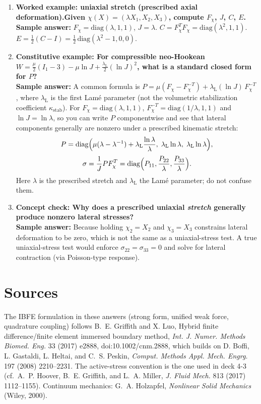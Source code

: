 \documentclass[12pt]{article}
\begin{document}
\begin{enumerate}
\item \textbf{Worked example: uniaxial stretch (prescribed axial deformation).\newline Given $\chi(X)=(\lambda X_1, X_2, X_3)$, compute $F_\chi$, $J$, $C$, $E$.}\\
\textbf{Sample answer:} $F_\chi=\mathrm{diag}(\lambda,1,1)$, $J=\lambda$.
$C=F_\chi^T F_\chi=\mathrm{diag}(\lambda^2,1,1)$.
$E=\tfrac12(C-I)=\tfrac12\,\mathrm{diag}(\lambda^2-1,0,0)$.

\item \textbf{Constitutive example: For compressible neo-Hookean $W=\frac{\mu}{2}(I_1-3)-\mu\ln J +\frac{\lambda_{\mathrm L}}{2}(\ln J)^2$,
what is a standard closed form for $P$?}\\
\textbf{Sample answer:} A common formula is
$P=\mu\left(F_\chi - F_\chi^{-T}\right) + \lambda_{\mathrm L}(\ln J)\,F_\chi^{-T}$,
where $\lambda_{\mathrm L}$ is the first Lam\'e parameter (not the volumetric stabilization coefficient $\kappa_{\mathrm{stab}}$).
For $F_\chi=\mathrm{diag}(\lambda,1,1)$, $F_\chi^{-T}=\mathrm{diag}(1/\lambda,1,1)$ and $\ln J=\ln\lambda$, so you can write
$P$ componentwise and see that lateral components generally are nonzero under a prescribed kinematic stretch:
\[
P=\mathrm{diag}\Bigl(\mu(\lambda-\lambda^{-1})+\lambda_{\mathrm L}\frac{\ln\lambda}{\lambda},\;
\lambda_{\mathrm L}\ln\lambda,\;\lambda_{\mathrm L}\ln\lambda\Bigr),
\]
\[
\sigma=\frac{1}{J}PF_\chi^T=\mathrm{diag}\Bigl(P_{11},\frac{P_{22}}{\lambda},\frac{P_{33}}{\lambda}\Bigr).
\]
Here $\lambda$ is the prescribed stretch and $\lambda_{\mathrm L}$ the Lam\'e parameter; do not confuse them.

\enlargethispage{2\baselineskip}
\item \textbf{Concept check: Why does a prescribed uniaxial \emph{stretch} generally produce nonzero lateral stresses?}\\
\textbf{Sample answer:} Because holding $\chi_2=X_2$ and $\chi_3=X_3$ constrains lateral deformation to be zero, which is
not the same as a uniaxial-stress test. A true uniaxial-stress test would enforce $\sigma_{22}=\sigma_{33}=0$ and solve for
lateral contraction (via Poisson-type response).



\end{enumerate}

\section*{Sources}
\small
The IBFE formulation in these answers (strong form, unified weak force, quadrature coupling) follows
B.~E. Griffith and X. Luo, Hybrid finite difference/finite element immersed boundary method,
\emph{Int. J. Numer. Methods Biomed. Eng.} 33 (2017) e2888, doi:10.1002/cnm.2888, which builds on
D. Boffi, L. Gastaldi, L. Heltai, and C.~S. Peskin, \emph{Comput. Methods Appl. Mech. Engrg.} 197 (2008) 2210--2231.
The active-stress convention is the one used in deck 4-3 (cf.\ A.~P. Hoover, B.~E. Griffith, and L.~A. Miller,
\emph{J. Fluid Mech.} 813 (2017) 1112--1155). Continuum mechanics: G.~A. Holzapfel, \emph{Nonlinear Solid Mechanics} (Wiley, 2000).
\end{document}
